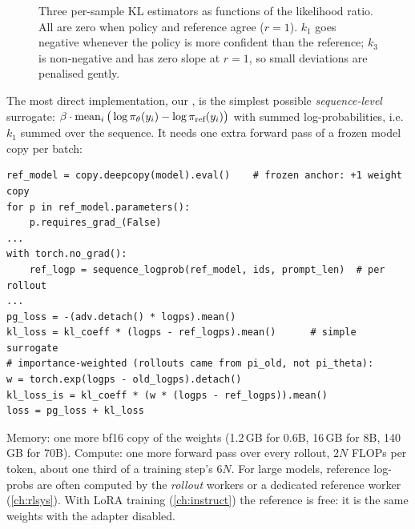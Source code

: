 \begin{figure}[ht]
\centering
{}
\caption{Three per-sample KL estimators as functions of the likelihood ratio. All are zero
when policy and reference agree ($r=1$). $k_1$ goes negative whenever the policy is more
confident than the reference; $k_3$ is non-negative and has zero slope at $r=1$, so small
deviations are penalised gently.}
\label{fig:grpo2:klest}
\end{figure}

The most direct implementation, our , is the
simplest possible \emph{sequence-level} surrogate: $\beta\cdot\operatorname{mean}_i\big(\log\pi_\theta(y_i)-\log\pi_{\text{ref}}(y_i)\big)$
with summed log-probabilities, i.e.\ $k_1$ summed over the sequence. It needs one extra
forward pass of a frozen model copy per batch:

\begin{lstlisting}[caption={Adding a KL term (sequence surrogate and the importance-weighted variant).},label={lst:grpo2:kl}]
ref_model = copy.deepcopy(model).eval()    # frozen anchor: +1 weight copy
for p in ref_model.parameters():
    p.requires_grad_(False)
...
with torch.no_grad():
    ref_logp = sequence_logprob(ref_model, ids, prompt_len)  # per rollout
...
pg_loss = -(adv.detach() * logps).mean()
kl_loss = kl_coeff * (logps - ref_logps).mean()      # simple surrogate
# importance-weighted (rollouts came from pi_old, not pi_theta):
w = torch.exp(logps - old_logps).detach()
kl_loss_is = kl_coeff * (w * (logps - ref_logps)).mean()
loss = pg_loss + kl_loss
\end{lstlisting}

\begin{napkinmath}
Memory: one more bf16 copy of the weights (1.2\,GB for 0.6B, 16\,GB for 8B, 140\,GB for 70B).
Compute: one more forward pass over every rollout, $2N$ FLOPs per token, about one third of a
training step's $6N$. For large models, reference log-probs are often computed by the
\emph{rollout} workers or a dedicated reference worker (\cref{ch:rlsys}). With LoRA training
(\cref{ch:instruct}) the reference is free: it is the same weights with the adapter
disabled.
\end{napkinmath}

